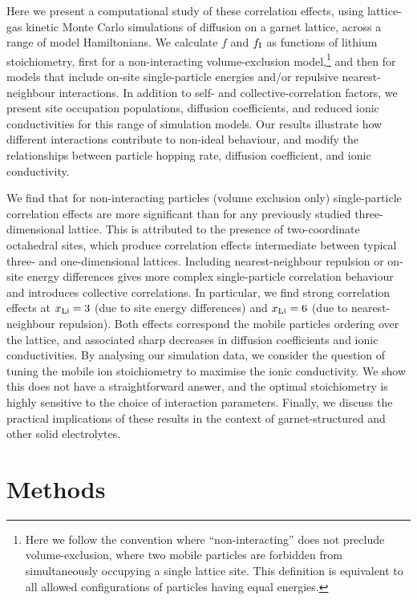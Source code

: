 \documentclass[aps,prb,twocolumn,superscriptaddress,reprint]{revtex4-1}
\newcommand{\xLi}{x_\m{Li}}
\begin{document}
Here we present a computational study of these correlation effects, using lattice-gas kinetic Monte Carlo simulations of diffusion on a garnet lattice, across a range of model Hamiltonians. 
We calculate $f$ and $f_{\mathrm{I}}$ as functions of lithium stoichiometry, first for a non-interacting volume-exclusion model,\footnote{Here we follow the convention where ``non-interacting'' does not preclude volume-exclusion, where two mobile particles are forbidden from simultaneously occupying a single lattice site.\cite{Kutner_PhysLett1981} This definition is equivalent to all allowed configurations of particles having equal energies.} and then for models that include on-site single-particle energies and/or repulsive nearest-neighbour interactions. 
In addition to self- and collective-correlation factors, we present site occupation populations, diffusion coefficients, and reduced ionic conductivities for this range of simulation models. Our results illustrate how different interactions contribute to non-ideal behaviour, and modify the relationships between particle hopping rate, diffusion coefficient, and ionic conductivity. 

We find that for non-interacting particles (volume exclusion only) single-particle correlation effects are more significant than for any previously studied three-dimensional lattice. This is attributed to the presence of two-coordinate octahedral sites, which produce correlation effects intermediate between typical three- and one-dimensional lattices. Including nearest-neighbour repulsion or on-site energy differences gives more complex single-particle correlation behaviour and introduces collective correlations. In particular, we find strong correlation effects at $\xLi=3$ (due to site energy differences) and $\xLi=6$ (due to nearest-neighbour repulsion). Both effects correspond the mobile particles ordering over the lattice, and associated sharp decreases in diffusion coefficients and ionic conductivities. By analysing our simulation data, we consider the question of tuning the mobile ion stoichiometry to maximise the ionic conductivity. We show this does not have a straightforward answer, and the optimal stoichiometry is highly sensitive to the choice of interaction parameters. Finally, we discuss the practical implications of these results in the context of garnet-structured and other solid electrolytes.

\section{Methods}
\end{document}
